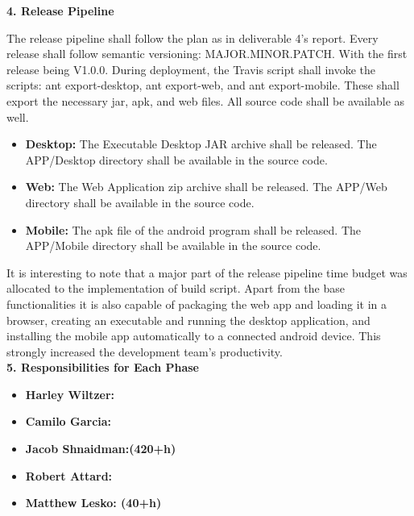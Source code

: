 \documentclass[12pt]{article}
\begin{document}
\textbf{4. Release Pipeline}


The release pipeline shall follow the plan as in deliverable 4's report. Every release shall follow semantic versioning: MAJOR.MINOR.PATCH. With the first release being V1.0.0. During deployment, the Travis script shall invoke the scripts: ant export-desktop, ant export-web, and ant export-mobile. These shall export the necessary jar, apk, and web files. All source code shall be available as well.
\begin{itemize}
	\item \textbf{Desktop:} The Executable Desktop JAR archive shall be released. The APP/Desktop directory shall be available in the source code.
	\item \textbf{Web:} The Web Application zip archive shall be released. The APP/Web directory shall be available in the source code.
	\item \textbf{Mobile:} The apk file of the android program shall be released. The APP/Mobile directory shall be available in the source code.
\end{itemize}

It is interesting to note that a major part of the release pipeline time budget was allocated to the
implementation of build script. Apart from the base functionalities it is also capable of packaging
the web app and loading it in a browser, creating an executable and running the desktop application,
and installing the mobile app automatically to a connected android device. This strongly increased
the development team's productivity.\\

\textbf{5. Responsibilities for Each Phase}
\begin{itemize}
    \item \textbf{Harley Wiltzer: }
    \item \textbf{Camilo Garcia: }
    \item \textbf{Jacob Shnaidman:(420+h) }
    \item \textbf{Robert Attard: }
    \item \textbf{Matthew Lesko: (40+h)} 
\end{itemize}
\end{document}

